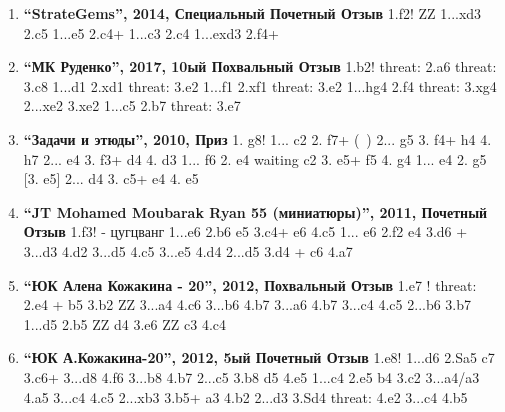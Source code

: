 \begin{enumerate}
\item \textbf{ ``StrateGems'', 2014, Специальный Почетный Отзыв } 1.\queen{}f2! ZZ
  1...\king{}xd3 2.\king{}c5 
  1...\king{}e5 2.\knight{}c4+
  1...\king{}c3 2.\knight{}c4
  1...exd3 2.\queen{}f4+

\item \textbf{ ``МК Руденко'', 2017, 10ый Похвальный Отзыв } 1.\rook{}b2! threat: 2.\bishop{}a6 threat: 3.\bishop{}c8 \mate{}
    1...\rook{}d1 2.\bishop{}xd1 threat: 3.\rook{}e2 \mate{}
    1...\rook{}f1 2.\bishop{}xf1 threat: 3.\rook{}e2 \mate{}
    1...hg4 2.\rook{}f4 threat: 3.\bishop{}xg4 \mate{}
            2...\rook{}xe2 3.\rook{}xe2 \mate{}
    1...c5 2.\rook{}b7 threat: 3.\rook{}e7 \mate{}

\item \textbf{ ``Задачи и этюды'', 2010, Приз } 1. \queen{}g8! 
1... c2 2. \queen{}f7+ (~)
  2... \king{}g5 3. \bishop{}f4+ \king{}h4 4. \queen{}h7\mate{}
  2... \king{}e4 3. \queen{}f3+ \king{}d4 4. \queen{}d3\mate{}
1... \king{}f6 2. e4 waiting c2 3. e5+ \king{}f5 4. \queen{}g4\mate{}
1... \king{}e4 2. \queen{}g5 [3. \queen{}e5\mate{}]
  2... \king{}d4 3. \queen{}c5+ \king{}e4 4. \queen{}e5\mate{}

\item \textbf{ ``JT Mohamed Moubarak Ryan 55 (миниатюры)'', 2011, Почетный Отзыв } 1.\queen{}f3! {- цугцванг}
   1...\king{}e6 2.\knight{}b6 \king{}e5 3.\knight{}c4+ \king{}e6 4.\knight{}c5 \mate{}
   1... e6 2.\queen{}f2 \king{}e4 3.\knight{}d6 +
                   3...\king{}d3 4.\queen{}d2 \mate{}
                   3...\king{}d5 4.\queen{}c5 \mate{}
                   3...\king{}e5 4.\queen{}d4 \mate{}
           2...\king{}d5 3.\queen{}d4 + \king{}c6 4.\knight{}a7 \mate{}

\item \textbf{ ``ЮК Алена Кожакина - 20'', 2012, Похвальный Отзыв } 1.\queen{}e7 ! threat: 2.\bishop{}e4 + \king{}b5 3.\king{}b2 ZZ
                    3...\king{}a4 4.\bishop{}c6 \mate{} 
                    3...\king{}b6 4.\queen{}b7 \mate{} 
                    3...\king{}a6 4.\queen{}b7 \mate{} 
                    3...\king{}c4 4.\queen{}c5 \mate{} 
            2...\king{}b6 3.\queen{}b7 \mate{} 
    1...\king{}d5 2.\bishop{}b5 ZZ \king{}d4 3.\queen{}e6 ZZ \king{}c3 4.\queen{}c4 \mate{}

\item \textbf{ ``ЮК А.Кожакина-20'', 2012, 5ый Почетный Отзыв } 1.\queen{}e8! 
1...\king{}d6 2.Sa5 \king{}c7 3.\queen{}c6+ 
    3...\king{}d8 4.\bishop{}f6\mate{} 
    3...\king{}b8 4.\queen{}b7\mate{} 
  2...\king{}c5 3.\queen{}b8 \king{}d5 4.\queen{}e5\mate{} 
1...\king{}c4 2.\queen{}e5 \king{}b4 3.\king{}c2 
    3...\king{}a4/\king{}a3 4.\queen{}a5\mate{} 
    3...\king{}c4 4.\queen{}c5\mate{} 
  2...\king{}xb3 3.\queen{}b5+ \king{}a3 4.\bishop{}b2\mate{} 
  2...\king{}d3 3.Sd4 threat: 4.\queen{}e2\mate{} 
    3...\king{}c4 4.\queen{}b5\mate{}


\end{enumerate}
